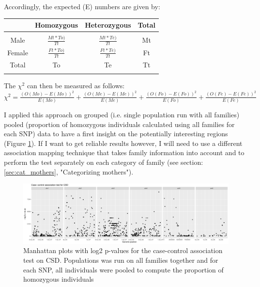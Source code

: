 \documentclass[10pt,a4paper]{report}
\begin{document}
Accordingly, the expected  (E) numbers are given by:

\begin{table}[h!]
\begin{tabular}{c|c c c}
& Homozygous & Heterozygous & Total\\[5px]
\hline\\[5px]
Male & $\frac{Mt*To)}{Tt}$ & $\frac{Mt*Te)}{Tt}$ & Mt\\[5px]
Female & $\frac{Ft*To)}{Tt}$ & $\frac{Ft*Te)}{Tt}$ & Ft\\[5px]
Total & To & Te & Tt\\
\vspace{5px}
\end{tabular}
\end{table}

The $\chi^2$ can then be measured as follows:\\
$\chi^2= \frac{(O(Mo)-E(Mo))^2}{E(Mo)} + \frac{(O(Me)-E(Me))^2}{E(Me)} + \frac{(O(Fo)-E(Fo))^2}{E(Fo)} + \frac{(O(Fe)-E(Fe))^2}{E(Fe)}$

I applied this approach on grouped (i.e. single population run with all families) pooled (proportion of homozygous individuals calculated using all families for each SNP) data to have a first insight on the potentially interesting regions (Figure \ref{naive_case_control}). If I want to get reliable results however, I will need to use a different association mapping technique that takes family information into account and to perform the test separately on each category of family (see section: \ref{sec:cat_mothers}, "Categorizing mothers").

\begin{figure}[h]
	\begin{center}
		\includegraphics[width=\textwidth]{association_mapping/naive_case_control_grouped.pdf}
		\caption{Manhattan plots with log2 p-values for the case-control association test on CSD. Populations was run on all families together and for each SNP, all individuals were pooled to compute the proportion of homozygous individuals}
		\label{naive_case_control}
	\end{center}
\end{figure}
\end{document}
